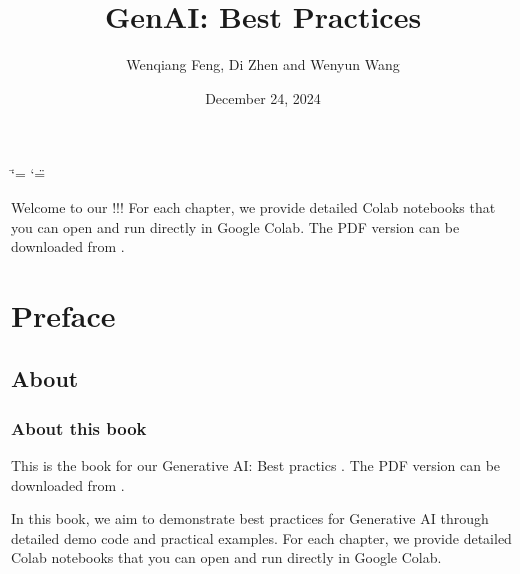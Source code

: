 \documentclass[letterpaper,11pt,english]{sphinxmanual}
\title{GenAI: Best Practices}
\date{December 24, 2024}
\author{Wenqiang Feng, Di Zhen and Wenyun Wang}
\begin{document}
\ifdefined\shorthandoff
  \ifnum\catcode`\=\string=\active\shorthandoff{=}\fi
  \ifnum\catcode`\"=\active{}\fi
\fi

\pagestyle{empty}
\sphinxmaketitle
\pagestyle{plain}
\sphinxtableofcontents
\pagestyle{normal}
\label{\detokenize{index::doc}}\label{\detokenize{index:index}}\begin{quote}

\begin{figure}[htbp]
\centering

\noindent{}
\end{figure}
\end{quote}

\sphinxAtStartPar
Welcome to our !!! For each chapter, we provide detailed
Colab notebooks  that you can open and run directly in Google Colab.
The PDF version can be downloaded from .



\sphinxstepscope


\chapter{Preface}
\label{\detokenize{preface:id1}}\label{\detokenize{preface::doc}}

\section{About}
\label{\detokenize{preface:about}}

\subsection{About this book}
\label{\detokenize{preface:about-this-book}}
\sphinxAtStartPar
This is the book for our Generative AI: Best practics .
The PDF version can be downloaded from .

\sphinxAtStartPar
In this book, we aim to demonstrate best practices for Generative AI
through detailed demo code and practical examples. For each chapter, we provide detailed
Colab notebooks  that you can open and run directly in Google Colab.
\end{document}
